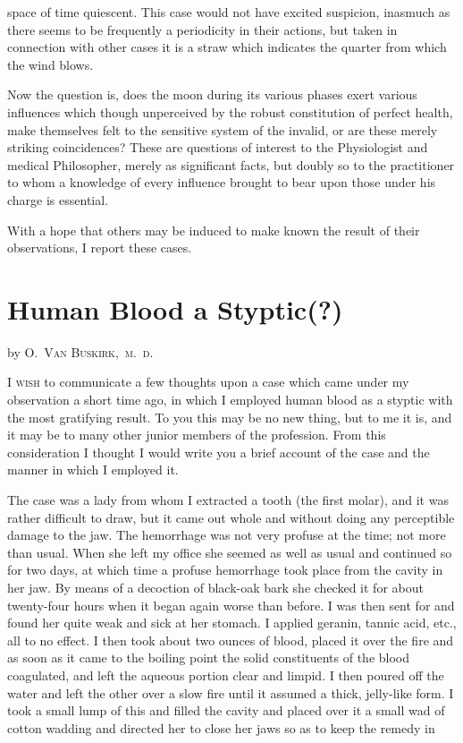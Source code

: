 space of time quiescent. This case would not have excited suspicion,
inasmuch as there seems to be frequently a periodicity in their
actions, but taken in connection with other cases it is a straw which
indicates the quarter from which the wind blows.

Now the question is, does the moon during its various phases exert
various influences which though unperceived by the robust constitution
of perfect health, make themselves felt to the sensitive system
of the invalid, or are these merely striking coincidences? These are
questions of interest to the Physiologist and medical Philosopher,
merely as significant facts, but doubly so to the practitioner to whom
a knowledge of every influence brought to bear upon those under his
charge is essential.

With a hope that others may be induced to make known the result
of their observations, I report these cases.

\chapter[Human Blood a Styptic][Human Blood a Styptic]{Human Blood a Styptic(?)}

by \textsc{O.\ Van Buskirk,\ m.\ d.}

\textsc{I wish} to communicate a few thoughts upon a case which came under
my observation a short time ago, in which I employed human blood as
a styptic with the most gratifying result. To you this may be no new
thing, but to me it is, and it may be to many other junior members of
the profession. From this consideration I thought I would write you
a brief account of the case and the manner in which I employed it.

The case was a lady from whom I extracted a tooth (the first molar),
and it was rather difficult to draw, but it came out whole and without
doing any perceptible damage to the jaw. The hemorrhage was not
very profuse at the time; not more than usual. When she left my office
she seemed as well as usual and continued so for two days, at which
time a profuse hemorrhage took place from the cavity in her jaw. By
means of a decoction of black-oak bark she checked it for about twenty-four
hours when it began again worse than before. I was then sent for
and found her quite weak and sick at her stomach. I applied geranin,
tannic acid, etc., all to no effect. I then took about two ounces of blood,
placed it over the fire and as soon as it came to the boiling point the
solid constituents of the blood coagulated, and left the aqueous portion
clear and limpid. I then poured off the water and left the other over
a slow fire until it assumed a thick, jelly-like form. I took a small lump
of this and filled the cavity and placed over it a small wad of cotton
wadding and directed her to close her jaws so as to keep the remedy in\endinput
